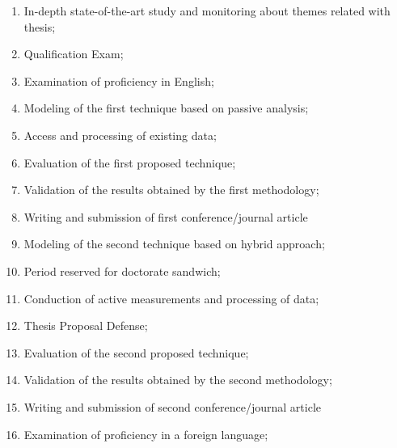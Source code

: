 \begin{enumerate}

\item In-depth state-of-the-art study and monitoring about themes related with thesis; \label{it:estado-da-arte}

\item Qualification Exam; \label{it:qualif}

\item Examination of proficiency in English; \label{it:english}

\item Modeling of the first technique based on passive analysis; \label{it:modelagem1}

\item Access and processing of existing data; \label{it:coleta1}

\item Evaluation of the first proposed technique; \label{it:evaluation1}

\item Validation of the results obtained by the first methodology; \label{it:validation1}

\item Writing and submission of first conference/journal article \label{it:writing1}

\item Modeling of the second technique based on hybrid approach; \label{it:modelagem2}

\item Period reserved for doctorate sandwich; \label{it:sanduba}

\item Conduction of active measurements and processing of data; \label{it:coleta2}

\item Thesis Proposal Defense; \label{it:def-prop-tese}

\item Evaluation of the second proposed technique; \label{it:evaluation2}

\item Validation of the results obtained by the second methodology; \label{it:validation2}

\item Writing and submission of second conference/journal article \label{it:writing2}

\item Examination of proficiency in a foreign language; \label{it:idioma}


\end{enumerate}
